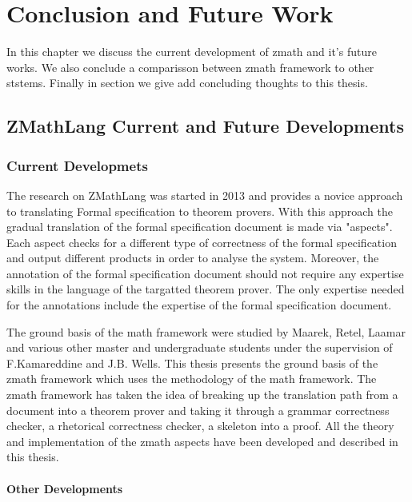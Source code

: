 \chapter{Conclusion and Future Work}
\label{ch:conclusion}

In this chapter we discuss the current development of \gls{zmath} and it's future works. We also conclude a comparisson between \gls{zmath} framework to other ststems. Finally in section we give add concluding thoughts to this thesis.

\section{ZMathLang Current and Future Developments}
\label{sec:zmathcurandfut}

\subsection{Current Developmets}
\label{subsec:currendevelopments}

The research on ZMathLang was started in 2013 and provides a novice approach to translating Formal specification to theorem provers. With this approach the gradual translation of the formal specification document is made via "aspects". Each aspect checks for a different type of correctness of the formal specification and output different products in order to analyse the system. Moreover, the annotation of the formal specification document should not require any expertise skills in the language of the targatted theorem prover. The only expertise needed for the annotations include the expertise of the formal specification document.

The ground basis of the \gls{math} framework were studied by Maarek, Retel, Laamar and various other master and undergraduate students under the supervision of F.Kamareddine and J.B. Wells. This thesis presents the ground basis of the \gls{zmath} framework which uses the methodology of the \gls{math} framework. The \gls{zmath} framework has taken the idea of breaking up the translation path from a document into a theorem prover and taking it through a grammar correctness checker, a rhetorical correctness checker, a skeleton into a proof. All the theory and implementation of the \gls{zmath} aspects have been developed and described in this thesis.

\subsubsection{Other Developments}

